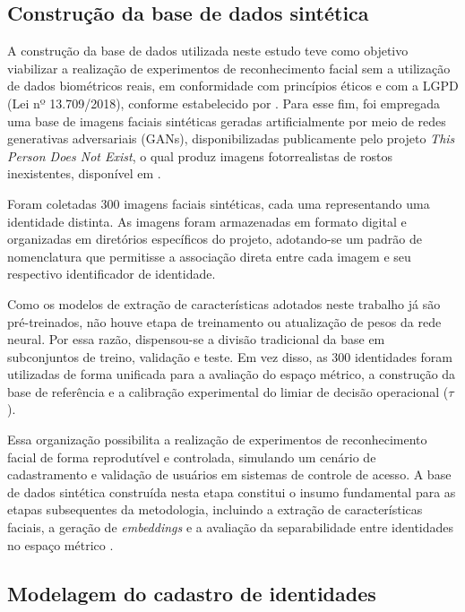 \subsection{Construção da base de dados sintética}

A construção da base de dados utilizada neste estudo teve como objetivo viabilizar a realização de experimentos de reconhecimento facial sem a utilização de dados biométricos reais, em conformidade com princípios éticos e com a \acs{LGPD} (Lei nº 13.709/2018), conforme estabelecido por \textcite{lgpd2018lei}. Para esse fim, foi empregada uma base de imagens faciais sintéticas geradas artificialmente por meio de redes generativas adversariais (\acs{GANs}), disponibilizadas publicamente pelo projeto \textit{This Person Does Not Exist}, o qual produz imagens fotorrealistas de rostos inexistentes, disponível em \cite{thispersondoesnotexist}.

Foram coletadas 300 imagens faciais sintéticas, cada uma representando uma identidade distinta. As imagens foram armazenadas em formato digital e organizadas em diretórios específicos do projeto, adotando-se um padrão de nomenclatura que permitisse a associação direta entre cada imagem e seu respectivo identificador de identidade.

Como os modelos de extração de características adotados neste trabalho já são pré-treinados, não houve etapa de treinamento ou atualização de pesos da rede neural. Por essa razão, dispensou-se a divisão tradicional da base em subconjuntos de treino, validação e teste. Em vez disso, as 300 identidades foram utilizadas de forma unificada para a avaliação do espaço métrico, a construção da base de referência e a calibração experimental do limiar de decisão operacional ($\tau$). 

Essa organização possibilita a realização de experimentos de reconhecimento facial de forma reprodutível e controlada, simulando um cenário de cadastramento e validação de usuários em sistemas de controle de acesso. A base de dados sintética construída nesta etapa constitui o insumo fundamental para as etapas subsequentes da metodologia, incluindo a extração de características faciais, a geração de \textit{embeddings} e a avaliação da separabilidade entre identidades no espaço métrico \cite{ge2018hierarchical}.


\subsection{Modelagem do cadastro de identidades}

